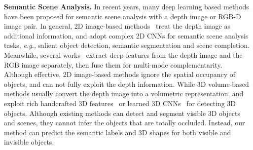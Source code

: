 \documentclass[10pt,twocolumn,letterpaper]{article}
\begin{document}
\textbf{Semantic Scene Analysis.}
In recent years, many deep learning based methods have been proposed for semantic scene analysis with a depth image or RGB-D image pair.
In general, 2D image-based methods~\cite{ren2012rgb,gupta2013perceptual,wang2018depth} treat the depth image as additional information, and adopt complex 2D CNNs for semantic scene analysis tasks, \emph{e.g.}, salient object detection, semantic segmentation and scene completion.
Meanwhile, several works~\cite{gupta2014learning,gupta2015indoor,atapour2017depthcomp} extract deep features from the depth image and the RGB image separately, then fuse them for multi-mode complementarity.
Although effective, 2D image-based methods ignore the spatial occupancy of objects, and can not fully exploit the depth information.
While 3D volume-based methods usually convert the depth image into a volumetric representation, and exploit rich handcrafted 3D features~\cite{ren2016three,song2014sliding} or learned 3D CNNs~\cite{song2016deep} for detecting 3D objects.
Although existing methods can detect and segment visible 3D objects and scenes, they cannot infer the objects that are totally occluded.
Instead, our method can predict the semantic labels and 3D shapes for both visible and invisible objects.
\end{document}
